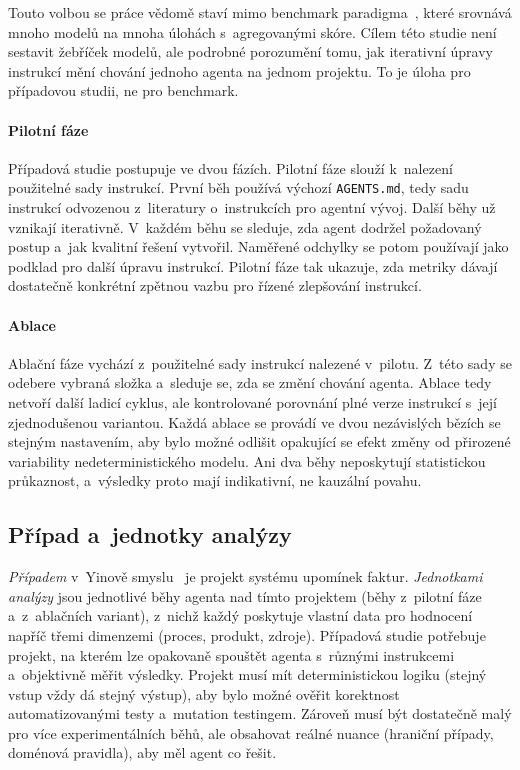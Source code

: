 Touto volbou se práce vědomě staví mimo benchmark
paradigma~\cite{swebench2024}, které srovnává mnoho modelů na
mnoha úlohách s~agregovanými skóre. Cílem této studie není sestavit žebříček
modelů, ale podrobné porozumění tomu, jak iterativní úpravy
instrukcí mění chování jednoho agenta na jednom projektu. To je
úloha pro případovou studii, ne pro benchmark.

\paragraph{Pilotní fáze}
\label{sec:pilotni-iterace}%
Případová studie postupuje ve dvou fázích. Pilotní fáze slouží
k~nalezení použitelné sady instrukcí. První běh používá výchozí
\texttt{AGENTS.md}, tedy sadu instrukcí odvozenou z~literatury
o~instrukcích pro agentní vývoj. Další běhy už vznikají iterativně.
V~každém běhu se sleduje, zda agent dodržel požadovaný postup a~jak
kvalitní řešení vytvořil. Naměřené odchylky se potom používají jako
podklad pro další úpravu instrukcí. Pilotní fáze tak ukazuje, zda
metriky dávají dostatečně konkrétní zpětnou vazbu pro řízené
zlepšování instrukcí.

\paragraph{Ablace}
\label{sec:komparativni-variace}%
Ablační fáze vychází z~použitelné sady instrukcí nalezené v~pilotu.
Z~této sady se odebere vybraná složka a~sleduje se, zda se změní
chování agenta. Ablace tedy netvoří další ladicí cyklus, ale
kontrolované porovnání plné verze instrukcí s~její zjednodušenou
variantou. Každá ablace se provádí ve dvou nezávislých bězích se
stejným nastavením, aby bylo možné odlišit opakující se efekt změny
od přirozené variability nedeterministického modelu. Ani dva běhy
neposkytují statistickou průkaznost, a~výsledky proto mají
indikativní, ne kauzální povahu.

\subsection{Případ a~jednotky analýzy}
\label{sec:vyber-projektu}

\textit{Případem} v~Yinově smyslu~\cite{yin2018} je projekt
systému upomínek faktur. \textit{Jednotkami analýzy}
jsou jednotlivé běhy agenta nad tímto projektem (běhy z~pilotní fáze
a~z~ablačních variant), z~nichž každý poskytuje vlastní data pro
hodnocení napříč třemi dimenzemi (proces, produkt, zdroje).
Případová studie potřebuje projekt, na kterém lze opakovaně spouštět
agenta s~různými instrukcemi a~objektivně měřit výsledky. Projekt
musí mít deterministickou logiku (stejný vstup vždy dá stejný
výstup), aby bylo možné ověřit korektnost automatizovanými testy
a~mutation testingem. Zároveň musí být dostatečně malý pro více
experimentálních běhů, ale obsahovat reálné nuance (hraniční případy,
doménová pravidla), aby měl agent co řešit.

